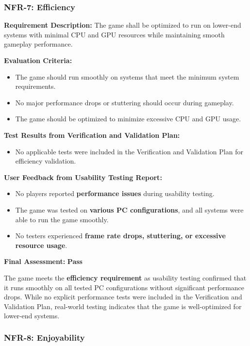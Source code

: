 \documentclass[12pt, titlepage]{article}
\begin{document}
\subsubsection{NFR-7: Efficiency}
\label{NFR7}

\textbf{Requirement Description:}  
The game shall be optimized to run on lower-end systems with minimal CPU and GPU resources while maintaining smooth gameplay performance.

\textbf{Evaluation Criteria:}  
\begin{itemize}
    \item The game should run smoothly on systems that meet the minimum system requirements.
    \item No major performance drops or stuttering should occur during gameplay.
    \item The game should be optimized to minimize excessive CPU and GPU usage.
\end{itemize}

\textbf{Test Results from Verification and Validation Plan:}  
\begin{itemize}
    \item No applicable tests were included in the Verification and Validation Plan for efficiency validation.
\end{itemize}

\textbf{User Feedback from Usability Testing Report:}  
\begin{itemize}
    \item No players reported \textbf{performance issues} during usability testing.
    \item The game was tested on \textbf{various PC configurations}, and all systems were able to run the game smoothly.
    \item No testers experienced \textbf{frame rate drops, stuttering, or excessive resource usage}.
\end{itemize}

\textbf{Final Assessment:} \textbf{Pass} 
 
The game meets the \textbf{efficiency requirement} as usability testing confirmed that it runs smoothly on all tested PC configurations without significant performance drops. While no explicit performance tests were included in the Verification and Validation Plan, real-world testing indicates that the game is well-optimized for lower-end systems.


\subsubsection{NFR-8: Enjoyability}
\label{NFR8}
\end{document}
